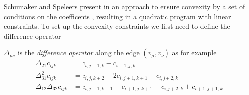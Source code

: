 
Schumaker and Speleers present in \cite{SS2014} an approach to ensure convexity by a set of conditions on the coefficents , resulting in a quadratic program with linear constraints. To set up the convexity constraints we first need to define the difference operator
\begin{definition}
	$\Delta_{\mu \nu}$ is the \emph{difference operator} along the edge $(v_\mu, v_\nu)$ as for example
	\begin{align*}
		\Delta_{21} c_{ijk} &= c_{i,j+1,k} -c_{i+1, j,k}  \\
		\Delta_{31}^2 c_{ijk} &= c_{i,j,k+2} -2c_{i, j+1,k+1} +c_{i, j+2,k} \\
		\Delta_{12} \Delta_{32} c_{ijk} &= c_{i,j+1,k+1} -c_{i+1, j,k+1} - c_{i,j+2,k} +c_{i+1, j+1,k}\\	\end{align*}
\end{definition}
 
